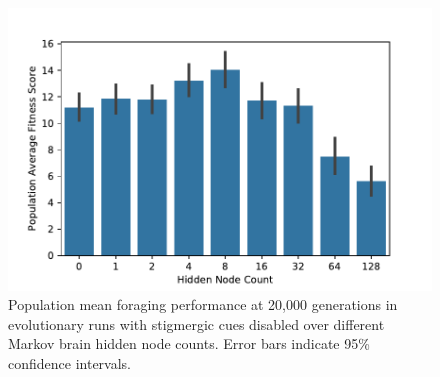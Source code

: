 \begin{figure}[!htbp]
\begin{center}
\includegraphics[width=\textwidth]{img/hidden_node_count_average_fitness.pdf}
\caption{
Population mean foraging performance at 20,000 generations in evolutionary runs with stigmergic cues disabled over different Markov brain hidden node counts.
Error bars indicate 95\% confidence intervals.
}
\label{fig:hidden_node_count_average_fitness}
\end{center}
\end{figure}
